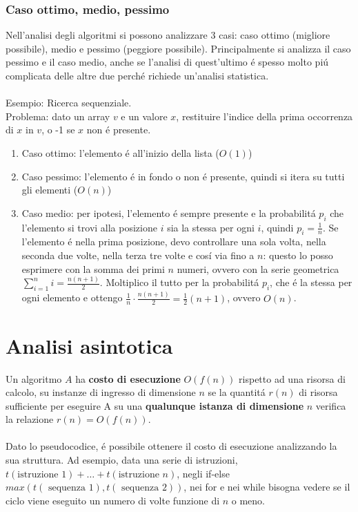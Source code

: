 \documentclass{article}
\begin{document}
\subsubsection{Caso ottimo, medio, pessimo}
Nell'analisi degli algoritmi si possono analizzare 3 casi: caso ottimo (migliore possibile), medio e pessimo (peggiore possibile). Principalmente si analizza il caso pessimo e il caso medio, anche se l'analisi di quest'ultimo é spesso molto piú complicata delle altre due perché richiede un'analisi statistica.\\\\
Esempio: Ricerca sequenziale.\\
Problema: dato un array $v$ e un valore $x$, restituire l'indice della prima occorrenza di $x$ in $v$, o -1 se $x$ non é presente.\\
\begin{enumerate}
	\item Caso ottimo: l'elemento é all'inizio della lista ($O(1)$)
	\item Caso pessimo: l'elemento é in fondo o non é presente, quindi si itera su tutti gli elementi ($O(n)$)
	\item Caso medio: per ipotesi, l'elemento é sempre presente e la probabilitá $p_i$ che l'elemento si trovi alla posizione $i$ sia la stessa per ogni $i$, quindi $p_i = \frac{1}{n}$. Se l'elemento é nella prima posizione, devo controllare una sola volta, nella seconda due volte, nella terza tre volte e cosí via fino a $n$: questo lo posso esprimere con la somma dei primi $n$ numeri, ovvero con la serie geometrica $\displaystyle \sum_{i=1}^{n} i = \frac{n(n+1)}{2}$. Moltiplico il tutto per la probabilitá $p_i$, che é la stessa per ogni elemento e ottengo $\displaystyle \frac{1}{n} \cdot \frac{n(n+1)}{2} = \frac{1}{2}(n+1)$, ovvero $O(n)$.
\end{enumerate}

\section{Analisi asintotica}
Un algoritmo $A$ ha \textbf{costo di esecuzione} $O(f(n))$ rispetto ad una risorsa di calcolo, su instanze di ingresso di dimensione $n$ se la quantitá $r(n)$ di risorsa sufficiente per eseguire A su una \textbf{qualunque istanza di dimensione} $n$ verifica la relazione $r(n) = O(f(n))$.\\\\
Dato lo pseudocodice, é possibile ottenere il costo di esecuzione analizzando la sua struttura. Ad esempio, data una serie di istruzioni, $t(\mbox{istruzione }1) + \dots + t(\mbox{istruzione }n)$, negli if-else $max(t(\mbox{ sequenza }1), t(\mbox{ sequenza }2))$, nei for e nei while bisogna vedere se il ciclo viene eseguito un numero di volte funzione di $n$ o meno.
\end{document}
